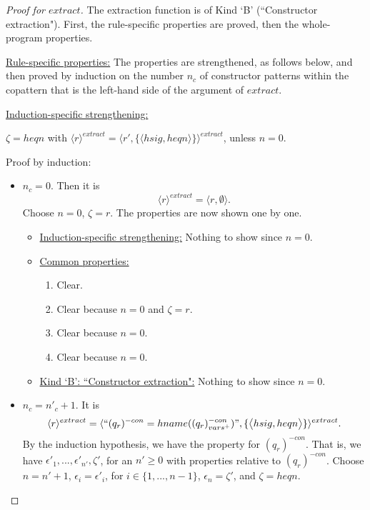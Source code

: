 \documentclass[11pt]{article} %
\begin{document}
\begin{proof}[Proof for $extract$]

The extraction function is of Kind `B' (``Constructor extraction"). First, the rule-specific properties are proved, then the whole-program properties.

\underline{Rule-specific properties:} The properties are strengthened, as follows below, and then proved by induction on the number $n_c$ of constructor patterns within the copattern that is the left-hand side of the argument of $extract$.

\underline{Induction-specific strengthening:}

$\zeta = heqn$ with $\langle r \rangle^{extract} = \langle r', \{\big\langle hsig, heqn \big\rangle\} \rangle^{extract}$, unless $n = 0$.

Proof by induction:

\begin{itemize}

\item $n_c = 0$.
Then it is
\begin{equation*}
\langle r \rangle^{extract} = \big\langle r, \emptyset \big\rangle.
\end{equation*}
Choose $n = 0$, $\zeta = r$. The properties are now shown one by one.

\begin{itemize}
\item \underline{Induction-specific strengthening:} Nothing to show since $n = 0$.

\item \underline{Common properties:}
\begin{enumerate}
\item Clear.
\item Clear because $n = 0$ and $\zeta = r$.
\item Clear because $n = 0$.
\item Clear because $n = 0$.
\end{enumerate}

\item \underline{Kind `B': ``Constructor extraction":} Nothing to show since $n = 0$.
\end{itemize}

\item $n_c = n'_c + 1$.
It is
\begin{equation*}
\langle r \rangle^{extract} = \langle `` (q_r)^{-con} = hname((q_r)^{-con}_{vars^+}) ", \{\big\langle hsig, heqn \big\rangle\} \rangle^{extract}.
\end{equation*}
By the induction hypothesis, we have the property for $(q_r)^{-con}$. That is, we have $\epsilon'_1, ..., \epsilon'_{n'}, \zeta'$, for an $n' \geq 0$ with properties relative to $(q_r)^{-con}$. Choose $n = n'+1$, $\epsilon_i = \epsilon'_i$, for $i \in \{1, ..., n-1\}$, $\epsilon_n = \zeta'$, and $\zeta = heqn$.


\end{itemize}
\end{proof}
\end{document}
